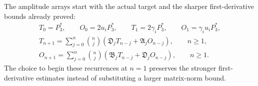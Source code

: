 \documentclass[11pt]{article}
\begin{document}
The amplitude arrays start with the actual target and the sharper
first-derivative bounds already proved:
\begin{equation}\label{tgdc:amplitude_majorants}
\begin{gathered}
 T_0=P_3^*,\qquad O_0=2u_iP_3^*,\qquad
 T_1=2\gamma_iP_3^*,\qquad O_1=\gamma_i u_iP_3^*,\\
 T_{n+1}=\sum_{j=0}^n\binom nj
      (\mathfrak D_jT_{n-j}+\mathfrak A_jO_{n-j}),\qquad n\geq1,\\
 O_{n+1}=\sum_{j=0}^n\binom nj
      (\mathfrak B_jT_{n-j}+\mathfrak D_jO_{n-j}),\qquad n\geq1.
\end{gathered}
\end{equation}
The choice to begin these recurrences at $n=1$ preserves the stronger
first-derivative estimates instead of substituting a larger matrix-norm
bound.
\end{document}
